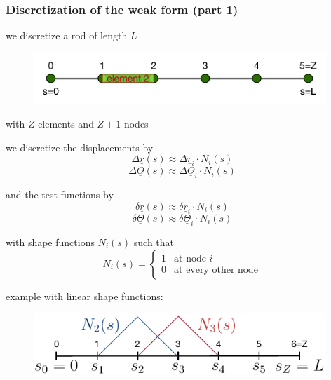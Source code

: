 \begin{frame}
  \frametitle{Discretization of the weak form (part 1)}
  
  \begin{multicols}{2}
    \noindent
    
    we discretize a rod of length $L$
    \begin{figure}
      \centering
      \includegraphics[width=11cm, keepaspectratio=true]{sections/cosserat_rods/images/DiscretizationWeakFormNodes}
    \end{figure}
    with $Z$ elements and $Z+1$ nodes
    
    \vspace{0.7em}
    we discretize the displacements by
    \begin{displaymath}
      \Delta \underline{r}(s) \approx \Delta \underline{r}_i \cdot N_i(s)
    \end{displaymath}
    \begin{displaymath}
      \Delta \underline{\Theta}(s) \approx \Delta \underline{\Theta}_i \cdot N_i(s)
    \end{displaymath}
    
    \vspace{0.5em}
    and the test functions by
    \begin{displaymath}
      \delta \underline{r}(s) \approx \delta \underline{r}_i \cdot N_i(s)
    \end{displaymath}
    \begin{displaymath}
      \delta \underline{\Theta}(s) \approx \delta \underline{\Theta}_i \cdot N_i(s)
    \end{displaymath}
    
    \vspace{1em}
    with shape functions $N_i(s)$ such that
    \begin{displaymath}
      N_i(s) =
      \begin{cases}
        1 & \text{at node } i \\
        0 & \text{at every other node}
      \end{cases}
    \end{displaymath}
    
    \vspace{0.6em}
    example with linear shape functions:
    \begin{figure}
      \centering
      \includegraphics[width=11cm, keepaspectratio=true]{sections/cosserat_rods/images/DiscretizationWeakFormShapeFunction}
    \end{figure}
    

\end{multicols}
\end{frame}
